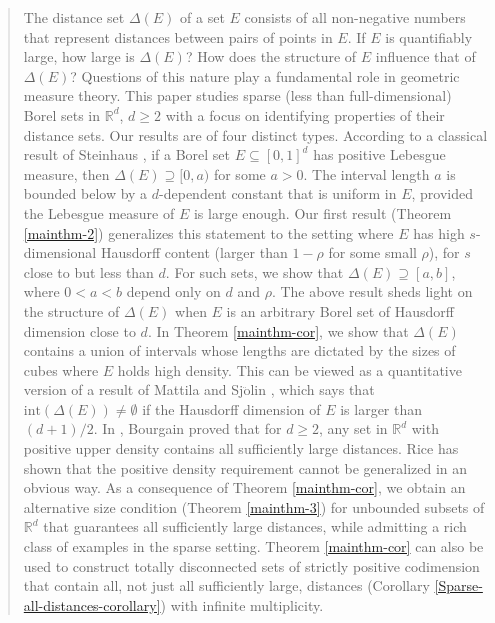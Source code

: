 \documentclass[a4paper,11pt]{amsart}
\numberwithin{equation}{section}
\begin{document}
\begin{abstract}
The distance set $\Delta(E)$ of a set $E$ consists of all non-negative numbers that represent distances between pairs of points in $E$. If $E$ is quantifiably large, how large is $\Delta(E)$? How does the structure of $E$ influence that of $\Delta(E)$? Questions of this nature play a fundamental role in geometric measure theory. This paper studies sparse (less than full-dimensional) Borel sets in $\mathbb R^d$, $d \geq 2$ with a focus on identifying properties of their distance sets. Our results are of four distinct types. 
\vskip0.05in
\noindent According to a classical result of Steinhaus \cite{Steinhaus}, if a Borel set $E \subseteq [0,1]^d$ has positive Lebesgue measure, then $\Delta(E) \supseteq [0, a)$ for some $a > 0$. The interval length $a$ is bounded below by a $d$-dependent constant that is uniform in $E$, provided the Lebesgue measure of $E$ is large enough. Our first result (Theorem \ref{mainthm-2}) generalizes this statement to the setting where $E$ has high $s$-dimensional Hausdorff content (larger than $1 - \rho$ for some small $\rho$), for $s$ close to but less than $d$. For such sets, we show that $\Delta(E) \supseteq [a, b]$, where $0<a<b$ depend only on $d$ and $\rho$. 
\vskip0.05in
\noindent The above result sheds light on the structure of $\Delta(E)$ when $E$ is an arbitrary Borel set of Hausdorff dimension close to $d$. In Theorem \ref{mainthm-cor}, we show that $\Delta(E)$ contains a union of intervals whose lengths are dictated by the sizes of cubes where $E$ holds high density. This can be viewed as a quantitative version of a result of Mattila and Sj$\ddot{\text{o}}$lin \cite{Mattila-Sjolin-99}, which says that $\text{int}(\Delta(E)) \ne \emptyset$ if the Hausdorff dimension of $E$ is larger than $(d+1)/2$.    
\vskip0.05in
\noindent In \cite{1986Bourgain}, Bourgain proved that for $d \geq 2$, any set in $\mathbb R^d$ with positive upper density contains all sufficiently large distances. Rice \cite{2020Rice} has shown that the positive density requirement cannot be generalized in an obvious way. As a consequence of Theorem \ref{mainthm-cor}, we obtain an alternative size condition (Theorem \ref{mainthm-3}) for unbounded subsets of $\mathbb R^d$ that guarantees all sufficiently large distances, while admitting a rich class of examples in the sparse setting. Theorem \ref{mainthm-cor} can also be used to construct totally disconnected sets of strictly positive codimension that contain all, not just all sufficiently large, distances (Corollary \ref{Sparse-all-distances-corollary}) with infinite multiplicity.      

\end{abstract}
\end{document}
